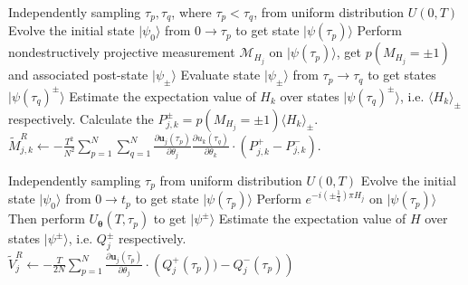 \documentclass[twocolumn,
pra,aps,superscriptaddress,showpacs,amsmath,amssymb]{revtex4-2}
\begin{document}
\IncMargin{1em}
\begin{algorithm}

\BlankLine
{
	{
		Independently sampling $\tau_p,\tau_q$, where $\tau_p < \tau_q$, from uniform distribution $U(0,T)$\;
		Evolve the initial state $|\psi_0\rangle$ from $0\rightarrow \tau_p$ to get state $|\psi(\tau_p)\rangle$\;
		Perform nondestructively projective measurement $\mathcal{M}_{H_j}$ on $|\psi(\tau_p)\rangle$, get $p(M_{H_j}=\pm 1)$ and associated post-state $|\psi_{\pm}\rangle$\;
		Evaluate state $|\psi_{\pm}\rangle$ from $\tau_p\rightarrow \tau_q$ to get states $|\psi(\tau_q)^{\pm}\rangle$\;
		Estimate the expectation value of $H_k$ over states $|\psi(\tau_q)^{\pm}\rangle$, i.e. $\langle H_k \rangle_{\pm}$ respectively.\;
		Calculate the $P_{j,k}^{\pm} = p(M_{H_j}=\pm1)\langle H_k\rangle_{\pm}$.
	}
}
$\tilde{M}_{j,k}^R \leftarrow -\frac{T^2}{N^2}\sum_{p=1}^N\sum_{q=1}^N \frac{\partial{\bm{u}_j}(\tau_p)}{\partial{\theta_j}}\frac{\partial{u_k}(\tau_q)}{\partial{\theta_k}}\cdot (P_{j,k}^{+} - P_{j,k}^{-})$.
\caption{Estimating matrix $M_{j,k}^R$}\label{algo_MR}\DecMargin{1em}
\end{algorithm}\DecMargin{1em}

\IncMargin{1em}
\begin{algorithm}[H]

\BlankLine
{
		Independently sampling $\tau_p$ from uniform distribution $U(0,T)$\;
		Evolve the initial state $|\psi_0\rangle$ from $0\rightarrow t_p$ to get state $|\psi(\tau_p)\rangle$\;
		Perform $e^{-i(\pm\frac{1}{4})\pi H_j}$ on $|\psi(\tau_p)\rangle$\;
		Then perform $U_{\bm{\theta}}(T,\tau_p)$ to get $|\psi^{\pm}\rangle$\;
		Estimate the expectation value of $H$ over states $|\psi^{\pm}\rangle$, i.e. $Q_j^{\pm}$ respectively.
}
$\tilde{V}_{j}^R \leftarrow -\frac{T}{2N}\sum_{p=1}^N \frac{\partial{\bm{u}_j}(\tau_p)}{\partial{\theta_j}} \cdot \left(Q_{j}^{+}(\tau_p)) - Q_{j}^{-}(\tau_p)\right)$\;
\caption{Estimating matrix $V_{j}^R$}\label{algo_VR}\DecMargin{1em}
\end{algorithm}\DecMargin{1em}
\end{document}
